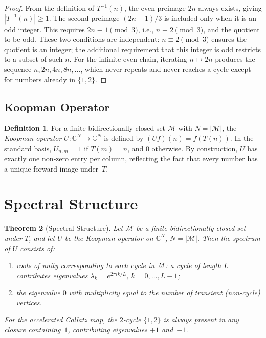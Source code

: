 \documentclass[12pt,a4paper]{article}
\newtheorem{theorem}{Theorem}[section]
\theoremstyle{definition}
\newtheorem{definition}[theorem]{Definition}
\theoremstyle{remark}
\begin{document}
\begin{proof}
From the definition of $T^{-1}(n)$, the even preimage $2n$ always
exists, giving $|T^{-1}(n)|\ge1$.
The second preimage $(2n-1)/3$ is included only when it is an odd
integer.
This requires $2n\equiv1\pmod3$, i.e., $n\equiv2\pmod3$, and the
quotient to be odd.
These two conditions are independent: $n\equiv2\pmod3$ ensures the
quotient is an integer; the additional requirement that this integer is
odd restricts to a subset of such $n$.
For the infinite even chain, iterating $n\mapsto2n$ produces the
sequence $n,2n,4n,8n,\dots$, which never repeats and never reaches a
cycle except for numbers already in $\{1,2\}$.
\end{proof}

\subsection{Koopman Operator}

\begin{definition}\label{def:koopman}
For a finite bidirectionally closed set $\mathcal M$ with
$N=|\mathcal M|$, the \emph{Koopman operator}
$U:\mathbb C^N\to\mathbb C^N$ is defined by $(Uf)(n)=f(T(n))$.
In the standard basis, $U_{n,m}=1$ if $T(m)=n$, and $0$ otherwise.
By construction, $U$ has exactly one non‑zero entry per column,
reflecting the fact that every number has a unique forward image
under~$T$.
\end{definition}

\section{Spectral Structure}

\begin{theorem}[Spectral Structure]\label{thm:spectral}
Let $\mathcal M$ be a finite bidirectionally closed set under $T$, and
let $U$ be the Koopman operator on $\mathbb C^N$, $N=|\mathcal M|$.
Then the spectrum of $U$ consists of:
\begin{enumerate}
\item roots of unity corresponding to each cycle in $\mathcal M$: a
      cycle of length $L$ contributes eigenvalues
      $\lambda_k=e^{2\pi ik/L}$, $k=0,\dots,L-1$;
\item the eigenvalue $0$ with multiplicity equal to the number of
      transient (non‑cycle) vertices.
\end{enumerate}
For the accelerated Collatz map, the $2$-cycle $\{1,2\}$ is always
present in any closure containing~$1$, contributing eigenvalues $+1$
and~$-1$.
\end{theorem}
\end{document}
